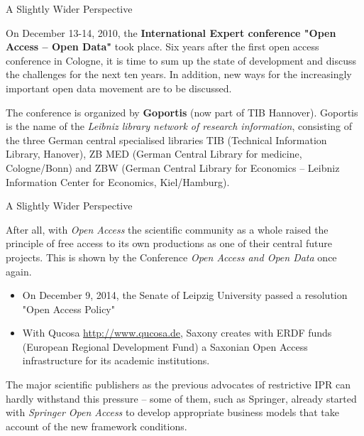 \documentclass{beamer}
\begin{document}
\begin{frame}{A Slightly Wider Perspective}

On December 13-14, 2010, the \textbf{International Expert conference "Open
  Access -- Open Data"} took place.  Six years after the first open access
conference in Cologne, it is time to sum up the state of development and
discuss the challenges for the next ten years. In addition, new ways for the
increasingly important open data movement are to be discussed.

The conference is organized by \textbf{Goportis} (now part of TIB Hannover).
Goportis is the name of the \emph{Leibniz library network of research
  information}, consisting of the three German central specialised libraries
TIB (Technical Information Library, Hanover), ZB MED (German Central Library
for medicine, Cologne/Bonn) and ZBW (German Central Library for Economics --
Leibniz Information Center for Economics, Kiel/Hamburg).  
\end{frame}

\begin{frame}{A Slightly Wider Perspective}

After all, with \emph{Open Access} the scientific community as a whole raised
the principle of free access to its own productions as one of their central
future projects. This is shown by the Conference \emph{Open Access and Open
  Data} once again.\vspace{-1em}
\begin{itemize}
\item On December 9, 2014, the Senate of Leipzig University passed a resolution
  "Open Access Policy"
\item With Qucosa \url{http://www.qucosa.de}, Saxony creates with ERDF funds
  (European Regional Development Fund) a Saxonian Open Access infrastructure
  for its academic institutions.
\end{itemize}\vspace{-1em}
The major scientific publishers as the previous advocates of restrictive IPR
can hardly withstand this pressure -- some of them, such as Springer, already
started with \emph{Springer Open Access} to develop appropriate business
models that take account of the new framework conditions.
\end{frame}
\end{document}
